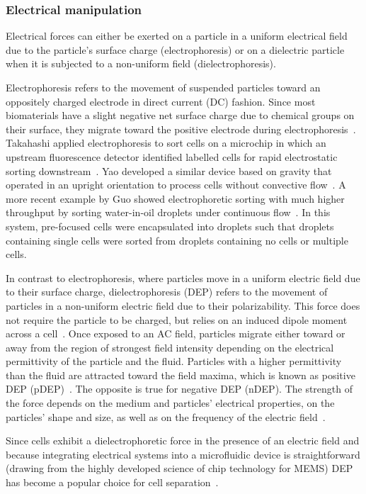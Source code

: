\subsubsection{Electrical manipulation}\label{subsubsec:electricalManipulation}
Electrical forces can either be exerted on a particle in a uniform electrical field due to the particle's surface charge (electrophoresis) or on a dielectric particle when it is subjected to a non-uniform field (dielectrophoresis).

Electrophoresis refers to the movement of suspended particles toward an oppositely charged electrode in direct current (DC) fashion. Since most biomaterials have a slight negative net surface charge due to chemical groups on their surface, they migrate toward the positive electrode during electrophoresis~\cite{Voldman2006}. Takahashi \etal{} applied electrophoresis to sort cells on a microchip in which an upstream fluorescence detector identified labelled cells for rapid electrostatic sorting downstream~\cite{Takahashi2004}. Yao \etal{} developed a similar device based on gravity that operated in an upright orientation to process cells without convective flow~\cite{Yao2004}. A more recent example by Guo \etal{} showed electrophoretic sorting with much higher throughput by sorting water-in-oil droplets under continuous flow~\cite{Guo2010}. In this system, pre-focused cells were encapsulated into droplets such that droplets containing single cells were sorted from droplets containing no cells or multiple cells.

In contrast to electrophoresis, where particles move in a uniform electric field due to their surface charge, dielectrophoresis (DEP) refers to the movement of particles in a non-uniform electric field due to their polarizability. This force does not require the particle to be charged, but relies on an induced dipole moment across a cell~\cite{Voldman2006}. Once exposed to an AC field, particles migrate either toward or away from the region of strongest field intensity depending on the electrical permittivity of the particle and the fluid. Particles with a higher permittivity than the fluid are attracted toward the field maxima, which is known as positive DEP (pDEP)~\cite{Lenshof2010}. The opposite is true for negative DEP (nDEP). The strength of the force depends on the medium and particles' electrical properties, on the particles' shape and size, as well as on the frequency of the electric field~\cite{Voldman2006}. 

Since cells exhibit a dielectrophoretic force in the presence of an electric field and because integrating electrical systems into a microfluidic device is straightforward (drawing from the highly developed science of chip technology for MEMS) DEP has become a popular choice for cell separation~\cite{Lackie2007}.

